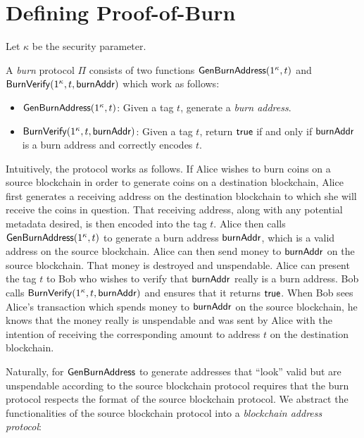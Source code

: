 \section{Defining Proof-of-Burn}

Let $\kappa$ be the security parameter.

\begin{definition}
  A \emph{burn} protocol $\Pi$ consists of two functions $\mathsf{GenBurnAddress}(1^\kappa, t)$ and $\mathsf{BurnVerify}(1^\kappa, t, \mathsf{burnAddr})$ which work as follows:

  \begin{itemize}
    \item $\mathsf{GenBurnAddress}(1^\kappa, t)$: Given a tag $t$, generate a \emph{burn address}.

    \item $\mathsf{BurnVerify}(1^\kappa, t, \mathsf{burnAddr})$: Given a tag $t$, return $\sf{true}$ if and only if $\mathsf{burnAddr}$ is a burn address and correctly encodes $t$.
  \end{itemize}
\end{definition}

Intuitively, the protocol works as follows. If Alice wishes to burn coins on a source blockchain in order to generate coins on a destination blockchain, Alice first generates a receiving address on the destination blockchain to which she will receive the coins in question. That receiving address, along with any potential metadata desired, is then encoded into the tag $t$. Alice then calls $\mathsf{GenBurnAddress}(1^\kappa, t)$ to generate a burn address $\mathsf{burnAddr}$, which is a valid address on the source blockchain. Alice can then send money to $\mathsf{burnAddr}$ on the source blockchain. That money is destroyed and unspendable. Alice can present the tag $t$ to Bob who wishes to verify that $\mathsf{burnAddr}$ really is a burn address. Bob calls $\mathsf{BurnVerify}(1^\kappa, t, \mathsf{burnAddr})$ and ensures that it returns $\mathsf{true}$. When Bob sees Alice's transaction which spends money to $\mathsf{burnAddr}$ on the source blockchain, he knows that the money really is unspendable and was sent by Alice with the intention of receiving the corresponding amount to address $t$ on the destination blockchain.

Naturally, for $\mathsf{GenBurnAddress}$ to generate addresses that ``look'' valid but are unspendable according to the source blockchain protocol requires that the burn protocol respects the format of the source blockchain protocol. We abstract the functionalities of the source blockchain protocol into a \emph{blockchain address protocol}:

